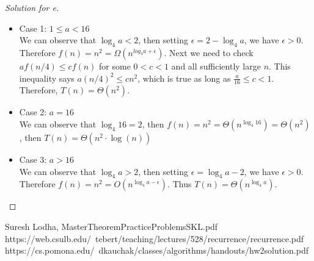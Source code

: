 \documentclass[12pt]{article}
\begin{document}
\begin{proof}[Solution for e]
	\ \\
	\begin{itemize}
		\item Case 1: $1\le a<16$\\
		We can observe that $\log_4a<2$, then setting $\epsilon=2-\log_4a$, we have $\epsilon>0$.  Therefore $f(n)=n^2=\Omega(n^{log_4a+\epsilon})$. Next we need to check $af(n/4)\le cf(n)$ for some $0<c<1$ and all sufficiently large $n$. This inequality says $a(n/4)^2\le cn^2$, which is true as long as $\frac{a}{16}\le c<1$. Therefore, $T(n)=\Theta(n^2)$.
		\item Case 2: $a=16$\\
		We can observe that $\log_4{16}=2$, then $f(n)=n^2=\Theta(n^{\log_4{16}})=\Theta(n^2)$, then $T(n)=\Theta(n^2\cdot\log(n))$\\
		\item Case 3: $a>16$\\
		We can observe that $\log_4a>2$, then setting $\epsilon=\log_{4}a-2$, we have $\epsilon>0$. Therefore $f(n)=n^2=O(n^{\log_4a-\epsilon})$. Thus $T(n)=\Theta(n^{\log_4a})$.
	\end{itemize}
\end{proof}
\bigskip


\begin{thebibliography}{prof}
	 Suresh Lodha, MasterTheoremPracticeProblemsSKL.pdf
	 https://web.csulb.edu/~tebert/teaching/lectures/528/recurrence/recurrence.pdf
	 https://cs.pomona.edu/~dkauchak/classes/algorithms/handouts/hw2solution.pdf
\end{thebibliography}
\end{document}
